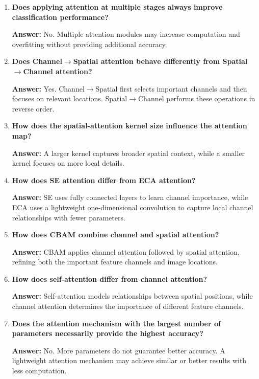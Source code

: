 \documentclass[10pt]{article}
\begin{document}
\begin{enumerate}
\textbf{Answer:} $P_2$ generally emphasizes fine details and textures, whereas $P_4$ focuses more on coarse structures and higher-level semantic information.

\item \textbf{Does applying attention at multiple stages always improve classification performance?}

\textbf{Answer:} No. Multiple attention modules may increase computation and overfitting without providing additional accuracy.

\item \textbf{Does Channel$\rightarrow$Spatial attention behave differently from Spatial$\rightarrow$Channel attention?}

\textbf{Answer:} Yes. Channel$\rightarrow$Spatial first selects important channels and then focuses on relevant locations. Spatial$\rightarrow$Channel performs these operations in reverse order.

\item \textbf{How does the spatial-attention kernel size influence the attention map?}

\textbf{Answer:} A larger kernel captures broader spatial context, while a smaller kernel focuses on more local details.

\item \textbf{How does SE attention differ from ECA attention?}

\textbf{Answer:} SE uses fully connected layers to learn channel importance, while ECA uses a lightweight one-dimensional convolution to capture local channel relationships with fewer parameters.

\item \textbf{How does CBAM combine channel and spatial attention?}

\textbf{Answer:} CBAM applies channel attention followed by spatial attention, refining both the important feature channels and image locations.

\item \textbf{How does self-attention differ from channel attention?}

\textbf{Answer:} Self-attention models relationships between spatial positions, while channel attention determines the importance of different feature channels.

\item \textbf{Does the attention mechanism with the largest number of parameters necessarily provide the highest accuracy?}

\textbf{Answer:} No. More parameters do not guarantee better accuracy. A lightweight attention mechanism may achieve similar or better results with less computation.


\end{enumerate}
\end{document}
